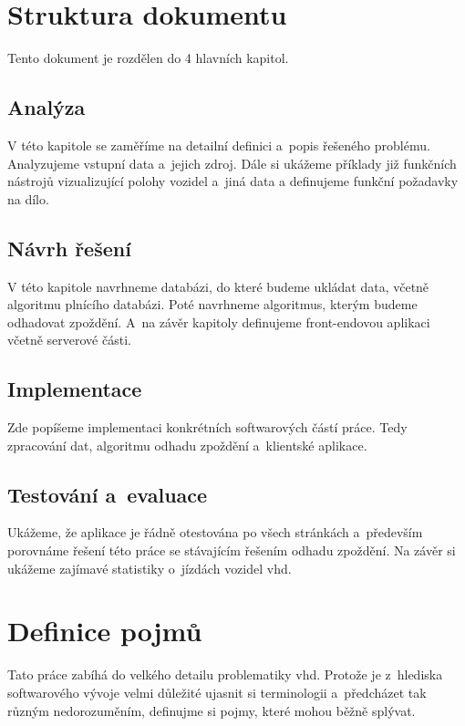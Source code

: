 \section*{Struktura dokumentu}

Tento dokument je rozdělen do 4 hlavních kapitol.

\subsection*{Analýza}

V této kapitole se zaměříme na detailní definici a~popis řešeného problému. Analyzujeme vstupní data a~jejich zdroj. Dále si ukážeme příklady již funkčních nástrojů vizualizující polohy vozidel a~jiná data a definujeme funkční požadavky na dílo.

\subsection*{Návrh řešení}

V této kapitole navrhneme databázi, do které budeme ukládat data, včetně algoritmu plnícího databázi. Poté navrhneme algoritmus, kterým budeme odhadovat zpoždění. A~na závěr kapitoly definujeme front-endovou aplikaci včetně serverové části.

\subsection*{Implementace}

Zde popíšeme implementaci konkrétních softwarových částí práce. Tedy zpracování dat, algoritmu odhadu zpoždění a~klientské aplikace.

\subsection*{Testování a~evaluace}

Ukážeme, že aplikace je řádně otestována po všech stránkách a~především porovnáme řešení této práce se stávajícím řešením odhadu zpoždění. Na závěr si ukážeme zajímavé statistiky o~jízdách vozidel \gls{vhd}.

\section*{Definice pojmů}

Tato práce zabíhá do velkého detailu problematiky \gls{vhd}. Protože je z~hlediska softwarového vývoje velmi důležité ujasnit si terminologii a~předcházet tak různým nedorozuměním, definujme si pojmy, které mohou běžně splývat.

